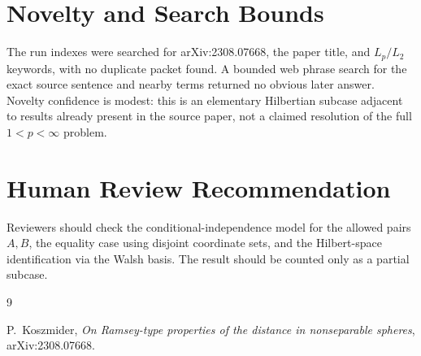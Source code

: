 \documentclass[11pt]{article}
\begin{document}
\section*{Novelty and Search Bounds}

The run indexes were searched for arXiv:2308.07668, the paper title, and \(L_p/L_2\) keywords, with no duplicate packet found.  A bounded web phrase search for the exact source sentence and nearby terms returned no obvious later answer.  Novelty confidence is modest: this is an elementary Hilbertian subcase adjacent to results already present in the source paper, not a claimed resolution of the full \(1<p<\infty\) problem.

\section*{Human Review Recommendation}

Reviewers should check the conditional-independence model for the allowed pairs \(A,B\), the equality case using disjoint coordinate sets, and the Hilbert-space identification via the Walsh basis.  The result should be counted only as a partial subcase.

\begin{thebibliography}{9}

P.~Koszmider,
\emph{On Ramsey-type properties of the distance in nonseparable spheres},
arXiv:2308.07668.

\end{thebibliography}
\end{document}
